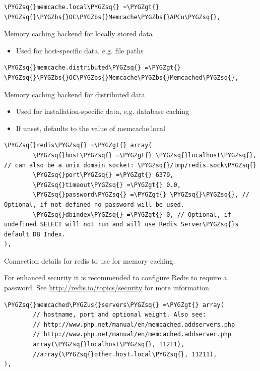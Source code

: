 \documentclass[letterpaper,10pt,english]{sphinxmanual}
\def\PYGZbs{\char`\\}
\def\PYGZus{\char`\_}
\def\PYGZgt{\char`\>}
\def\PYGZsq{\char`\'}
\begin{document}
\begin{Verbatim}[commandchars=\\\{\}]
\PYGZsq{}memcache.local\PYGZsq{} =\PYGZgt{} \PYGZsq{}\PYGZbs{}OC\PYGZbs{}Memcache\PYGZbs{}APCu\PYGZsq{},
\end{Verbatim}

Memory caching backend for locally stored data
\begin{itemize}
\item {} 
Used for host-specific data, e.g. file paths

\end{itemize}

\begin{Verbatim}[commandchars=\\\{\}]
\PYGZsq{}memcache.distributed\PYGZsq{} =\PYGZgt{} \PYGZsq{}\PYGZbs{}OC\PYGZbs{}Memcache\PYGZbs{}Memcached\PYGZsq{},
\end{Verbatim}

Memory caching backend for distributed data
\begin{itemize}
\item {} 
Used for installation-specific data, e.g. database caching

\item {} 
If unset, defaults to the value of memcache.local

\end{itemize}

\begin{Verbatim}[commandchars=\\\{\}]
\PYGZsq{}redis\PYGZsq{} =\PYGZgt{} array(
        \PYGZsq{}host\PYGZsq{} =\PYGZgt{} \PYGZsq{}localhost\PYGZsq{}, // can also be a unix domain socket: \PYGZsq{}/tmp/redis.sock\PYGZsq{}
        \PYGZsq{}port\PYGZsq{} =\PYGZgt{} 6379,
        \PYGZsq{}timeout\PYGZsq{} =\PYGZgt{} 0.0,
        \PYGZsq{}password\PYGZsq{} =\PYGZgt{} \PYGZsq{}\PYGZsq{}, // Optional, if not defined no password will be used.
        \PYGZsq{}dbindex\PYGZsq{} =\PYGZgt{} 0, // Optional, if undefined SELECT will not run and will use Redis Server\PYGZsq{}s default DB Index.
),
\end{Verbatim}

Connection details for redis to use for memory caching.

For enhanced security it is recommended to configure Redis
to require a password. See \href{http://redis.io/topics/security}{http://redis.io/topics/security}
for more information.

\begin{Verbatim}[commandchars=\\\{\}]
\PYGZsq{}memcached\PYGZus{}servers\PYGZsq{} =\PYGZgt{} array(
        // hostname, port and optional weight. Also see:
        // http://www.php.net/manual/en/memcached.addservers.php
        // http://www.php.net/manual/en/memcached.addserver.php
        array(\PYGZsq{}localhost\PYGZsq{}, 11211),
        //array(\PYGZsq{}other.host.local\PYGZsq{}, 11211),
),
\end{Verbatim}
\end{document}

